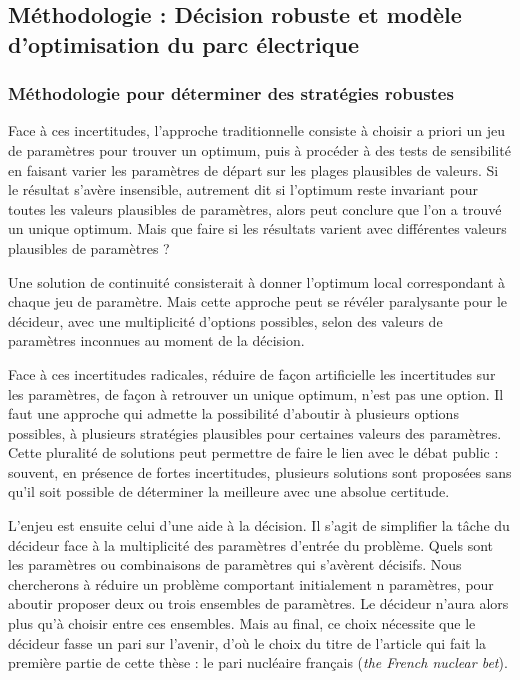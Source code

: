 \subsection{Méthodologie : Décision robuste et modèle d’optimisation du parc électrique}

\subsubsection{Méthodologie pour déterminer des stratégies robustes}

Face à ces incertitudes, l’approche traditionnelle consiste à choisir a priori un jeu de paramètres pour trouver un optimum, puis à procéder à des tests de sensibilité en faisant varier les paramètres de départ sur les plages plausibles de valeurs. Si le résultat s’avère insensible, autrement dit si l’optimum reste invariant pour toutes les valeurs plausibles de paramètres, alors peut conclure que l’on a trouvé un unique optimum.
Mais que faire si les résultats varient avec différentes valeurs plausibles de paramètres ? 

Une solution de continuité consisterait à donner l’optimum local correspondant à chaque jeu de paramètre. Mais cette approche peut se révéler paralysante pour le décideur, avec une multiplicité d’options possibles, selon des valeurs de paramètres inconnues au moment de la décision.

Face à ces incertitudes radicales, réduire de façon artificielle les incertitudes sur les paramètres, de façon à retrouver un unique optimum, n’est pas une option. Il faut une approche qui admette la possibilité d’aboutir à plusieurs options possibles, à plusieurs stratégies plausibles pour certaines valeurs des paramètres. Cette pluralité de solutions peut permettre de faire le lien avec le débat public : souvent, en présence de fortes incertitudes, plusieurs solutions sont proposées sans qu’il soit possible de déterminer la meilleure avec une absolue certitude. 

L’enjeu est ensuite celui d’une aide à la décision. Il s’agit de simplifier la tâche du décideur face à la multiplicité des paramètres d’entrée du problème. Quels sont les paramètres ou combinaisons de paramètres qui s’avèrent décisifs. Nous chercherons à réduire un problème comportant initialement n paramètres, pour aboutir proposer deux ou trois ensembles de paramètres. Le décideur n’aura alors plus qu’à choisir entre ces ensembles. Mais au final, ce choix nécessite que le décideur fasse un pari sur l’avenir, d’où le choix du titre de l’article qui fait la première partie de cette thèse : le pari nucléaire français (\textit{the French nuclear bet}).

